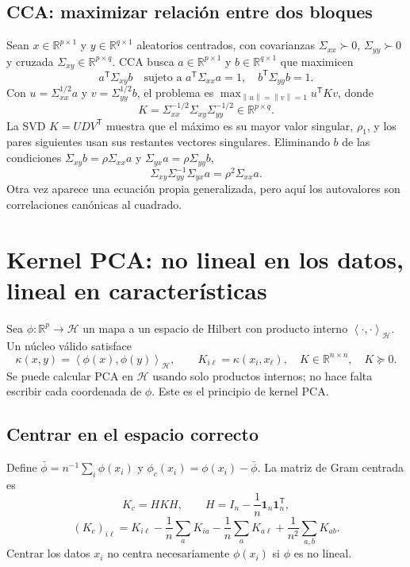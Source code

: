 \documentclass[11pt,a4paper]{article}
\newcommand{\R}{\mathbb R}
\newcommand{\T}{^{\mathsf T}}
\newcommand{\norm}[1]{\left\lVert #1\right\rVert}
\newcommand{\ip}[2]{\left\langle #1,#2\right\rangle}
\newcommand{\ones}{\mathbf 1}
\theoremstyle{definition}
\begin{document}
\subsection{CCA: maximizar relación entre dos bloques}
Sean $x\in\R^{p\times1}$ y $y\in\R^{q\times1}$ aleatorios centrados, con covarianzas $\Sigma_{xx}\succ0$, $\Sigma_{yy}\succ0$ y cruzada $\Sigma_{xy}\in\R^{p\times q}$. CCA busca $a\in\R^{p\times1}$ y $b\in\R^{q\times1}$ que maximicen
\[
a\T\Sigma_{xy}b\quad\text{sujeto a }a\T\Sigma_{xx}a=1,\quad b\T\Sigma_{yy}b=1.
\]
Con $u=\Sigma_{xx}^{1/2}a$ y $v=\Sigma_{yy}^{1/2}b$, el problema es $\max_{\norm u=\norm v=1}u\T Kv$, donde
\[
K=\Sigma_{xx}^{-1/2}\Sigma_{xy}\Sigma_{yy}^{-1/2}\in\R^{p\times q}.
\]
La SVD $K=UDV\T$ muestra que el máximo es su mayor valor singular, $\rho_1$, y los pares siguientes usan sus restantes vectores singulares. Eliminando $b$ de las condiciones $\Sigma_{xy}b=\rho\Sigma_{xx}a$ y $\Sigma_{yx}a=\rho\Sigma_{yy}b$,
\[
\Sigma_{xy}\Sigma_{yy}^{-1}\Sigma_{yx}a=\rho^2\Sigma_{xx}a.
\]
Otra vez aparece una ecuación propia generalizada, pero aquí los autovalores son correlaciones canónicas al cuadrado.

\section{Kernel PCA: no lineal en los datos, lineal en características}
Sea $\phi:\R^p\to\mathcal H$ un mapa a un espacio de Hilbert con producto interno $\ip{\cdot}{\cdot}_{\mathcal H}$. Un núcleo válido satisface
\[
\kappa(x,y)=\ip{\phi(x)}{\phi(y)}_{\mathcal H},\qquad
K_{i\ell}=\kappa(x_i,x_\ell),\quad K\in\R^{n\times n},\quad K\succeq0.
\]
Se puede calcular PCA en $\mathcal H$ usando solo productos internos; no hace falta escribir cada coordenada de $\phi$. Este es el principio de kernel PCA.
\subsection{Centrar en el espacio correcto}
Define $\bar\phi=n^{-1}\sum_i\phi(x_i)$ y $\phi_c(x_i)=\phi(x_i)-\bar\phi$. La matriz de Gram centrada es
\[
\boxed{K_c=HKH},\qquad H=I_n-\frac1n\ones_n\ones_n\T,
\]
\[
(K_c)_{i\ell}=K_{i\ell}-\frac1n\sum_aK_{ia}-\frac1n\sum_aK_{a\ell}+\frac1{n^2}\sum_{a,b}K_{ab}.
\]
Centrar los datos $x_i$ no centra necesariamente $\phi(x_i)$ si $\phi$ es no lineal.
\end{document}
